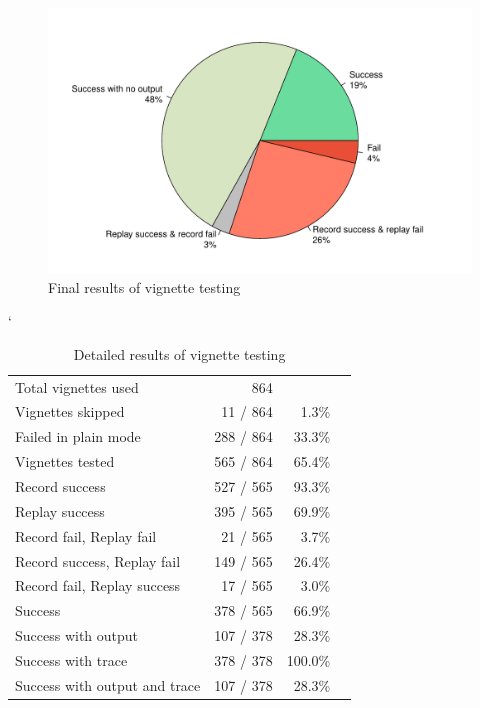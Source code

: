 \documentclass[thesis=M,english,hidelinks]{FITthesis}[2012/10/20]
\begin{document}
	\begin{figure}[ht]\centering
		\includegraphics[width=1.0\textwidth]{vignettes/results}
		\caption{Final results of vignette testing}
	\end{figure}
	
	\begin{table}[ht]
		\catcode`
		\centering
		\setlength\extrarowheight{1mm}
		\renewcommand{\tabcolsep}{3pt}
		\begin{tabularx}{\textwidth}{lRRR}
			Total vignettes used & 864 &\\
			Vignettes skipped & 11 / 864 & 1.3\% \\
			Failed in plain mode & 288 / 864 & 33.3\% \\
			Vignettes tested & 565 / 864 & 65.4\% \\
			Record success & 527 / 565 & 93.3\% \\
			Replay success & 395 / 565 & 69.9\% \\
			Record fail, Replay fail & 21 / 565 & 3.7\% \\
			Record success, Replay fail & 149 / 565 & 26.4\% \\
			Record fail, Replay success & 17 / 565 & 3.0\% \\
			Success & 378 / 565 & 66.9\% \\
			Success with output & 107 / 378 & 28.3\% \\
			Success with trace & 378 / 378 & 100.0\% \\
			Success with output and trace & 107 / 378 & 28.3\% \\
		\end{tabularx}
		\caption{Detailed results of vignette testing}
	\end{table}
	\FloatBarrier
	\pagebreak
	
\end{document}

